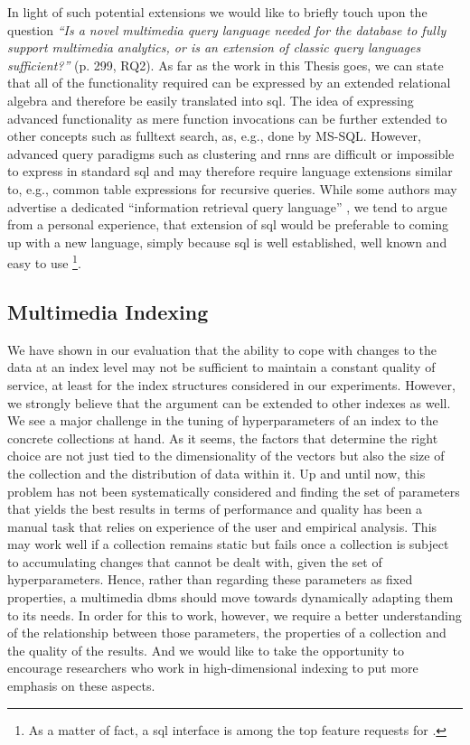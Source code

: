 In light of such potential extensions we would like to briefly touch upon the question  \emph{``Is a novel multimedia query language needed for the database to fully support multimedia analytics, or is an extension of classic query languages sufficient?''} \cite{Jonson:2016Ten} (p. 299, RQ2). As far as the work in this Thesis goes, we can state that all of the functionality required can be expressed by an extended relational algebra and therefore be easily translated into \acrshort{sql}. The idea of expressing advanced functionality as mere function invocations can be further extended to other concepts such as fulltext search, as, e.g., done by MS-SQL. However, advanced query paradigms such as clustering and \acrshort{rnns} are difficult or impossible to express in standard \acrshort{sql} and may therefore require language extensions similar to, e.g., common table expressions for recursive queries. While some authors may advertise a dedicated ``information retrieval query language'' \cite{Ferro:2014Bridging}, we tend to argue from a personal experience, that extension of \acrshort{sql} would be preferable to coming up with a new language, simply because \acrshort{sql} is well established, well known and easy to use \footnote{As a matter of fact, a \acrshort{sql} interface is among the top feature requests for \cottontail{}.}.

\subsection{Multimedia Indexing}

We have shown in our evaluation that the ability to cope with changes to the data at an index level may not be sufficient to maintain a constant quality of service, at least for the index structures considered in our experiments. However, we strongly believe that the argument can be extended to other indexes as well. We see a major challenge in the tuning of hyperparameters of an index to the concrete collections at hand. As it seems, the factors that determine the right choice are not just tied to the dimensionality of the vectors but also the size of the collection and the distribution of data within it. Up and until now, this problem has not been systematically considered and finding the set of parameters that yields the best results in terms of performance and quality has been a manual task that relies on experience of the user and empirical analysis. This may work well if a collection remains static but fails once a collection is subject to accumulating changes that cannot be dealt with, given the set of hyperparameters. Hence, rather than regarding these parameters as fixed properties, a multimedia \acrshort{dbms} should move towards dynamically adapting them to its needs. In order for this to work, however, we require a better understanding of the relationship between those parameters, the properties of a collection and the quality of the results. And we would like to take the opportunity to encourage researchers who work in high-dimensional indexing to put more emphasis on these aspects.

